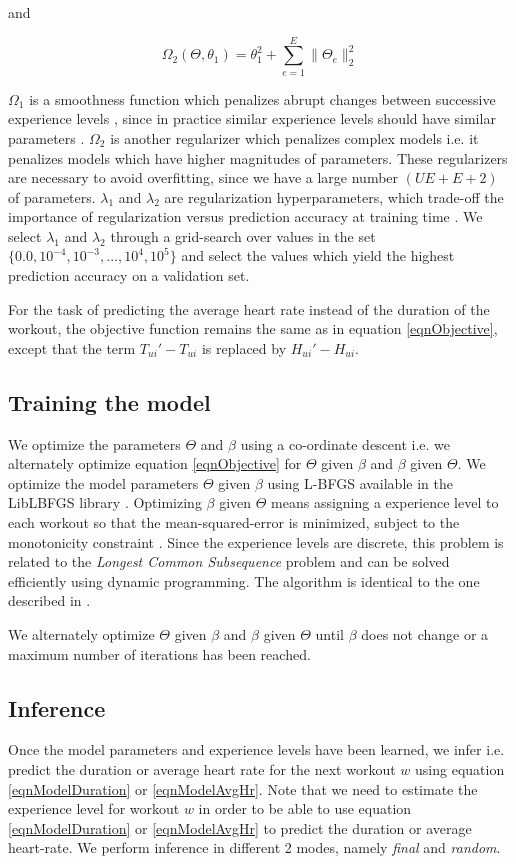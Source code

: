 \documentclass{acm_proc_article-sp}
\begin{document}
and

$$\Omega_2(\Theta, \theta_1) = \theta_1^2 + \sum_{e=1}^{E}{\|\Theta_e \|_2^2}$$

$\Omega_1$ is a smoothness function which penalizes abrupt changes between successive experience levels \cite{www13}, since in practice similar experience levels should have similar parameters \cite{www13}. $\Omega_2$ is another regularizer which penalizes complex models i.e. it penalizes models which have higher magnitudes of parameters. These regularizers are necessary to avoid overfitting, since we have a large number $(UE + E + 2)$ of parameters. $\lambda_1$ and $\lambda_2$ are regularization hyperparameters, which trade-off the importance of regularization versus prediction accuracy at training time \cite{www13}. We select $\lambda_1$ and $\lambda_2$ through a grid-search over values in the set $\{0.0, 10^{-4}, 10^{-3},..., 10^4, 10^5\}$ and select the values which yield the highest prediction accuracy on a validation set.

For the task of predicting the average heart rate instead of the duration of the workout, the objective function remains the same as in equation \ref{eqnObjective}, except that the term $T_{ui}' - T_{ui}$ is replaced by $H_{ui}' - H_{ui}$.

\subsection{Training the model}
We optimize the parameters $\Theta$ and $\beta$ using a co-ordinate descent \cite{coordinateDescentWiki} i.e. we alternately optimize equation \ref{eqnObjective} for $\Theta$ given $\beta$ and $\beta$ given $\Theta$. We optimize the model parameters $\Theta$ given $\beta$ using L-BFGS \cite{lbfgs} available in the LibLBFGS library \cite{liblbfgs}. Optimizing $\beta$ given $\Theta$ means assigning a experience level to each workout so that the mean-squared-error is minimized, subject to the monotonicity constraint \cite{www13}. Since the experience levels are discrete, this problem is related to the \emph{Longest Common Subsequence} problem \cite{lcs} and can be solved efficiently using dynamic programming. The algorithm is identical to the one described in \cite{www13}.

We alternately optimize $\Theta$ given $\beta$ and $\beta$ given $\Theta$ until $\beta$ does not change or a maximum number of iterations has been reached.

\subsection{Inference}
Once the model parameters and experience levels have been learned, we infer i.e. predict the duration or average heart rate for the next workout $w$ using equation \ref{eqnModelDuration} or \ref{eqnModelAvgHr}. Note that we need to estimate the experience level for workout $w$ in order to be able to use equation \ref{eqnModelDuration} or \ref{eqnModelAvgHr} to predict the duration or average heart-rate. We perform inference in different 2 modes, namely \emph{final} and \emph{random}. 
\end{document}
